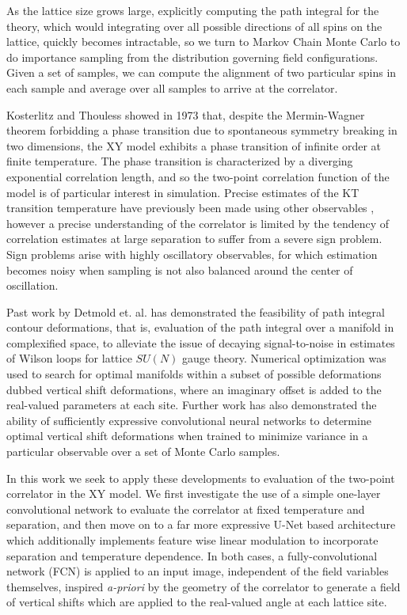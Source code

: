 \documentclass[12pt]{article}
\begin{document}
As the lattice size grows large, explicitly computing the path integral for the theory, which would integrating over all possible directions of all spins on the lattice,
quickly becomes intractable, so we turn to Markov Chain Monte Carlo to do importance sampling from the distribution governing field configurations. Given a set of samples, we can compute the alignment of two
particular spins in each sample and average over all samples to arrive at the correlator.

Kosterlitz and Thouless \cite{KT} showed in 1973 that, despite the Mermin-Wagner theorem forbidding a phase transition due to spontaneous symmetry breaking
in two dimensions, the XY model exhibits a phase transition of infinite order at finite temperature. The phase transition is characterized by a diverging
exponential correlation length, and so the two-point correlation function of the model is of particular interest in simulation. Precise estimates of the KT transition
temperature have previously been made using other observables \cite{Hasenbusch_2005}, however a precise understanding of the correlator is limited by
the tendency of correlation estimates at large separation to suffer from a severe sign problem. Sign problems arise with highly oscillatory observables, for which
estimation becomes noisy when sampling is not also balanced around the center of oscillation.

Past work by Detmold et. al. \cite{Detmold_2021} has demonstrated the feasibility of path integral contour deformations, that is, evaluation
of the path integral over a manifold in complexified space, to alleviate the issue of decaying signal-to-noise in estimates of Wilson loops for lattice $SU(N)$ gauge theory.
Numerical optimization was used to search for optimal manifolds within a subset of possible deformations dubbed vertical shift deformations, where an imaginary offset is added to the
real-valued parameters at each site. Further work \cite{detmold2023signaltonoiseimprovementneuralnetwork} has also demonstrated the ability of sufficiently expressive convolutional neural networks
to determine optimal vertical shift deformations when trained to minimize variance in a particular observable over a set of Monte Carlo samples.

In this work we seek to apply these developments to evaluation of the two-point correlator in the XY model. We first investigate the use of a simple one-layer
convolutional network to evaluate the correlator at fixed temperature and separation, and then move on to a far more expressive U-Net \cite{ronneberger2015unetconvolutionalnetworksbiomedical}
based architecture which additionally implements feature wise linear modulation \cite{perez2017filmvisualreasoninggeneral} to incorporate separation and temperature dependence. In both cases,
a fully-convolutional network (FCN) is applied to an input image, independent of the field variables themselves, inspired \textit{a-priori} by the geometry of the correlator to generate a field of vertical shifts which are applied to
the real-valued angle at each lattice site.
\end{document}

